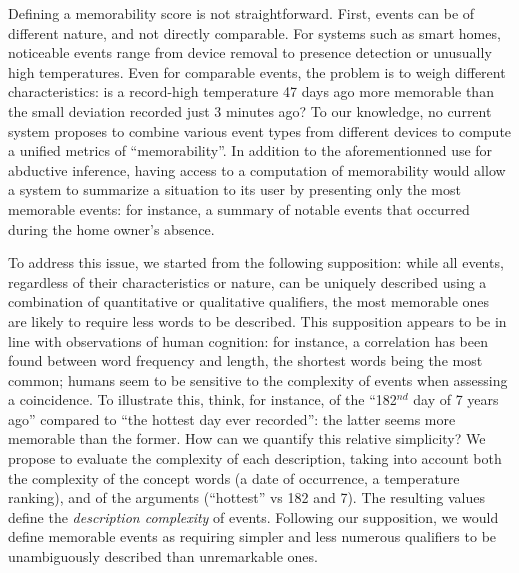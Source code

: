 \documentclass[entropy,article,submit,moreauthors,pdftex]{Definitions/mdpi}
\begin{document}
Defining a memorability score is not straightforward. First, events can be of different nature, and not directly
comparable. For systems such as smart homes, noticeable events
range from device removal to presence detection or unusually high
temperatures. Even for comparable events, the problem is to weigh different characteristics: is a record-high temperature 47 days
ago more memorable than the small deviation recorded just 3 minutes ago? To
our knowledge, no current system proposes to combine various
event types from different devices to compute a unified metrics of
``memorability''. 
In addition to the aforementionned use for abductive inference, having access to a computation of memorability would allow a system to summarize a situation to its user by presenting only the most memorable events: for instance, a summary of notable events that occurred during the home owner's absence.

To address this issue, we started from the following supposition: while all
events, regardless of their characteristics or nature, can be uniquely
described using a combination of quantitative or qualitative qualifiers, the most memorable ones are
likely to require less words to be described. This supposition appears to be in line with observations of human cognition: for instance, a correlation has been found between word frequency and length\cite{strauss_word_2007}, the shortest words being the most common; humans seem to be sensitive to the complexity of events when assessing a coincidence\cite{griffiths_probability_2003,dessalles_coincidences_2011}. To illustrate this, think, for instance, of the ``182$^{nd}$ day of 7 years ago'' compared to ``the hottest day ever recorded'': the latter seems more memorable than the former. How can we quantify this relative simplicity? We propose to evaluate the complexity of each
description, taking into account both the complexity of the concept words (a date
of occurrence, a temperature ranking), and of the arguments (``hottest'' vs
182 and 7). The resulting values define the  \emph{description complexity}
of events. Following our supposition, we would define memorable events as requiring simpler and less numerous qualifiers to be unambiguously described than unremarkable ones.
\end{document}

